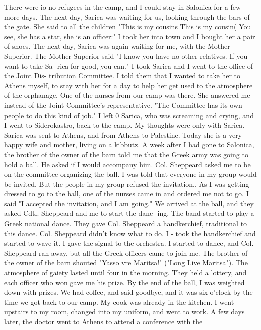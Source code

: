 There were io no refugees in the camp, and I could stay in Salonica for a few more days. 
The next day, Sarica was waiting for us, looking through the bars of the gate. She 
said to all the children "This is my cousins This is my cousin( You see, she has a 
star, she is an officer:" I took her into town and I bought her a pair of shoes. 
The next day, Sarica was again waiting for me, with the Mother Superior. The 
Mother Superior said "I know you have no other relatives. If you want to take Sa-
rica for good, you can." I took Sarica and I went to the office of the Joint Dis-
tribution Committee. I told them that I wanted to take her to Athens myself, to stay 
with her for a day to help her get used to the atmosphere of the orphanage. One of 
the nurses from our camp was there. She answered me instead of the Joint Committee's 
representative. "The Committee has its own people to do this kind of job." I left 
0 
Sarica, who was screaming and crying, and I went to Siderokastro, back to the camp. 
My thoughts were only with Sarica. Sarica was sent to Athens, and from Athens to 
Palestine. Today she is a very happy wife and mother, living on a kibbutz. 
A week after I had gone to Salonica, the brother of the owner of the barn told 
me that the Greek army was going to hold a ball. He asked if I would accompany him. 
Col. Sheppeard asked me to be on the committee organizing the ball. I was told 
that everyone in my group would be invited. But the people in my group refused the 
invitation.. As I was getting dressed to go to the ball, one of the nurses came in 
and ordered me not to go. I said "I accepted the invitation, and I am going." 
We arrived at the ball, and they asked Cdtl. Sheppeard and me to start the danc-
ing. The band started to play a Greek national dance. They gave Col. Sheppeard a 
handkerchief, traditional to this dance. Col. Sheppeard didn't know what to do. I - 
took the handkerchief and started to wave it. I gave the signal to the orchestra. 
I started to dance, and Col. Sheppeard ran away, but all the Greek officers came to 
join me. The brother of the owner of the barn shouted "Yasso vre Maritsa!" ("Long 
Live Maritsa"). The atmosphere of gaiety lasted until four in the morning. They 
held a lottery, and each officer who won gave me his prize. By the end of the ball, 
I was weighted down with prizes. We had coffee, and said goodbye, and it was six 
o'clock by the time we got back to our camp. My cook was already in the kitchen. 
I went upstairs to my room, changed into my uniform, and went to work. 
A few days later, the doctor went to Athens to attend a conference with the 
